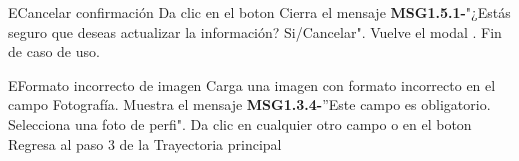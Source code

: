 \begin{UCtrayectoriaA}{E}{Cancelar confirmación}
	\UCpaso[\UCactor] Da clic en el boton 
	\UCpaso Cierra el mensaje {\bf MSG1.5.1-}"¿Estás seguro que deseas actualizar la información? Si/Cancelar".
	\UCpaso Vuelve el modal .
	\UCpaso Fin de caso de uso.
\end{UCtrayectoriaA}

\begin{UCtrayectoriaA}{E}{Formato incorrecto de imagen}
	\UCpaso[\UCactor] Carga una imagen con formato incorrecto en el campo Fotografía.
	\UCpaso Muestra el mensaje {\bf MSG1.3.4-}''Este campo es obligatorio. Selecciona una foto de perfi".
	\UCpaso[\UCactor] Da clic en cualquier otro campo o en el boton 
	\UCpaso Regresa al paso 3 de la Trayectoria principal
\end{UCtrayectoriaA}
